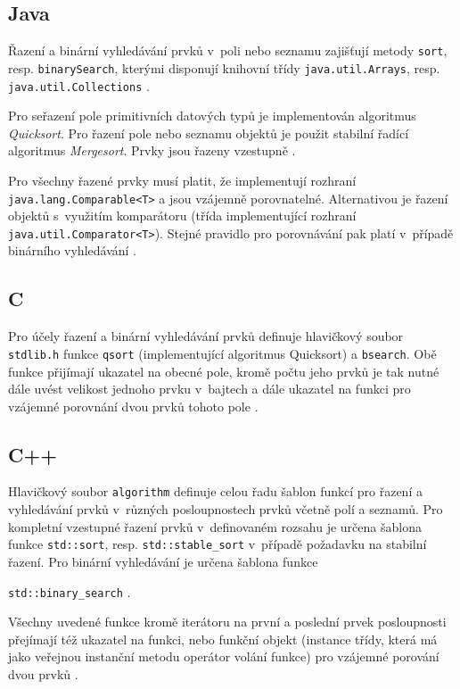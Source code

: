 \documentclass{bakalarka}
\begin{document}
\subsection{Java}
Řazení a binární vyhledávání prvků v~poli nebo seznamu zajišťují metody \texttt{sort}, resp. \texttt{binarySearch}, kterými disponují knihovní třídy \texttt{java.util\-.Arrays}, resp. \texttt{java.util.Collections} \cite{java-guide-arrays, java-guide-collections}.\par
Pro seřazení pole primitivních datových typů je implementován algoritmus \textit{Quicksort}. Pro řazení pole nebo seznamu objektů je použit stabilní řadící algoritmus \textit{Mergesort}. Prvky jsou řazeny vzestupně \cite{java-guide-arrays, java-guide-collections}.\par
Pro všechny řazené prvky musí platit, že implementují rozhraní \texttt{java\-.lang.Comparable<T>} a jsou vzájemně porovnatelné. Alternativou je řazení objektů s~využitím komparátoru (třída implementující rozhraní \texttt{java.util\-.Comparator<T>}). Stejné pravidlo pro porovnávání pak platí v~případě binárního vyhledávání \cite{java-guide-arrays, java-guide-collections, java-guide-comparable, java-guide-comparator}.\par

\subsection{C}
Pro účely řazení a binární vyhledávání prvků definuje hlavičkový soubor \texttt{stdlib.h} funkce \texttt{qsort} (implementující algoritmus Quicksort) a \texttt{bsearch}. Obě funkce přijímají ukazatel na obecné pole, kromě počtu jeho prvků je tak nutné dále uvést velikost jednoho prvku v~bajtech a dále ukazatel na funkci pro vzájemné porovnání dvou prvků tohoto pole \cite{cpp-guide-qsort, cpp-guide-bsearch}.

\subsection{C++}
Hlavičkový soubor \texttt{algorithm} definuje celou řadu šablon funkcí pro řazení a vyhledávání prvků v~různých posloupnostech prvků včetně polí a seznamů. Pro kompletní vzestupné řazení prvků v~definovaném rozsahu je určena šablona funkce \texttt{std::sort}, resp. \texttt{std::stable\_sort} v~případě požadavku na stabilní řazení. Pro binární vyhledávání je určena šablona funkce \par\noindent\texttt{std::binary\_search} \cite{cpp-guide-stdsort, cpp-guide-stdstablesort, cpp-guide-stdbinarysearch}.\par
Všechny uvedené funkce kromě iterátoru na první a poslední prvek posloupnosti přejímají též ukazatel na funkci, nebo funkční objekt (instance třídy, která má jako veřejnou instanční metodu operátor volání funkce) pro vzájemné porování dvou prvků \cite{cpp-guide-stdsort, cpp-guide-stdstablesort, cpp-guide-stdbinarysearch}.
\end{document}
